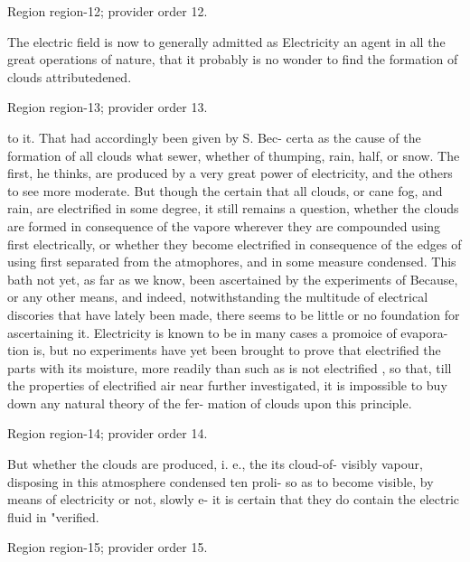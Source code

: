 \documentclass[11pt]{article}
\begin{document}
{\scriptsize\color{gray} Region region-12; provider order 12.\par}
\medskip

The electric field is now to generally admitted as Electricity an agent in all the great operations of nature, that it probably is no wonder to find the formation of clouds attributedened.
\par

{\scriptsize\color{gray} Region region-13; provider order 13.\par}
\medskip

to it. That had accordingly been given by S. Bec- certa as the cause of the formation of all clouds what sewer, whether of thumping, rain, half, or snow. The first, he thinks, are produced by a very great power of electricity, and the others to see more moderate. But though the certain that all clouds, or cane fog, and rain, are electrified in some degree, it still remains a question, whether the clouds are formed in consequence of the vapore wherever they are compounded using first electrically, or whether they become electrified in consequence of the edges of using first separated from the atmophores, and in some measure condensed. This bath not yet, as far as we know, been ascertained by the experiments of Because, or any other means, and indeed, notwithstanding the multitude of electrical discories that have lately been made, there seems to be little or no foundation for ascertaining it. Electricity is known to be in many cases a promoice of evapora- tion is, but no experiments have yet been brought to prove that electrified the parts with its moisture, more readily than such as is not electrified , so that, till the properties of electrified air near further investigated, it is impossible to buy down any natural theory of the fer- mation of clouds upon this principle.
\par

{\scriptsize\color{gray} Region region-14; provider order 14.\par}
\medskip

But whether the clouds are produced, i. e., the its cloud-of- visibly vapour, disposing in this atmosphere condensed ten proli- so as to become visible, by means of electricity or not, slowly e- it is certain that they do contain the electric fluid in "verified.
\par

{\scriptsize\color{gray} Region region-15; provider order 15.\par}
\medskip
\end{document}
